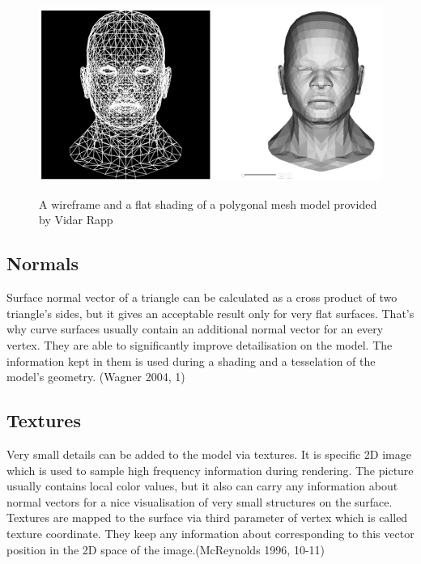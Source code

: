 \documentclass[twoside, english, 11pt]{report}
\begin{document}
\begin{figure}[!h]
\includegraphics[scale=0.55]{img/mesh}\\
\caption{A wireframe and a flat shading of a polygonal mesh model provided by Vidar Rapp\label{fig:mesh}}
\end{figure}

\subsection{Normals}
Surface normal vector of a triangle can be calculated as a cross product of two triangle's sides, but it gives an acceptable result only for very flat surfaces. That's why curve surfaces usually contain an additional normal vector for an every vertex. They are able to significantly improve detailisation on the model. The information kept in them is used during a shading and a tesselation of the model's geometry. (Wagner 2004, 1)\\


\subsection{Textures}
Very small details can be added to the model via textures. It is specific 2D image which is used to sample high frequency information during rendering. The picture usually contains local color values, but it also can carry any information about normal vectors for a nice visualisation of very small structures on the surface. Textures are mapped to the surface via third parameter of vertex which is called texture coordinate. They keep any information about corresponding to this vector position in the 2D space of the image.(McReynolds 1996, 10-11)\\
\end{document}
